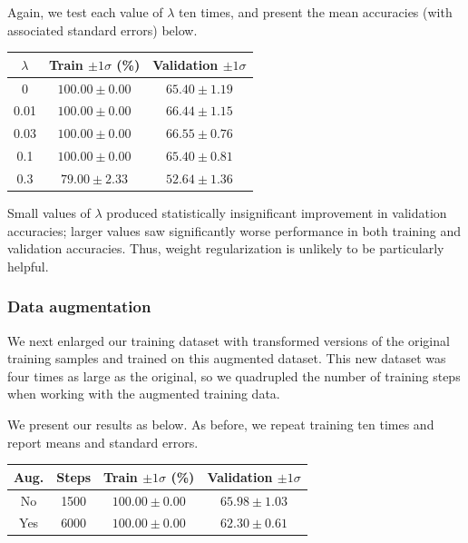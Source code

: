 \documentclass{article}
\begin{document}
\begin{multicols}{2}
Again, we test each value of $\lambda$ ten times,
and present the mean accuracies (with associated standard errors) below.

\begin{center}
    \begin{tabular}{c|cc}
        $\lambda$ & Train $\pm 1 \sigma$ (\%) & Validation $\pm 1 \sigma$\\\hline
        0    & $100.00 \pm 0.00$ & $65.40 \pm 1.19$ \\
        0.01 & $100.00 \pm 0.00$ & $66.44 \pm 1.15$ \\
        0.03 & $100.00 \pm 0.00$ & $66.55 \pm 0.76$ \\
        0.1  & $100.00 \pm 0.00$ & $65.40 \pm 0.81$ \\
        0.3  &  $79.00 \pm 2.33$ & $52.64 \pm 1.36$ \\
    \end{tabular}
\end{center}
Small values of $\lambda$ produced
statistically insignificant improvement in validation accuracies;
larger values saw significantly worse performance
in both training and validation accuracies.
Thus, weight regularization
is unlikely to be particularly helpful.


\subsubsection{Data augmentation}

We next enlarged our training dataset
with transformed versions of the original training samples
and trained on this augmented dataset.
This new dataset was four times as large as the original,
so we quadrupled the number of training steps
when working with the augmented training data.

We present our results as below.
As before, we repeat training ten times
and report means and standard errors.
\begin{center}
    \begin{tabular}{cc|cc}
        Aug. & Steps & Train $\pm 1 \sigma$ (\%) & Validation $\pm 1 \sigma$\\\hline
        No  & 1500 & $100.00 \pm 0.00$ & $65.98 \pm 1.03$ \\
        Yes & 6000 & $100.00 \pm 0.00$ & $62.30 \pm 0.61$
    \end{tabular}
\end{center}


\end{multicols}
\end{document}
